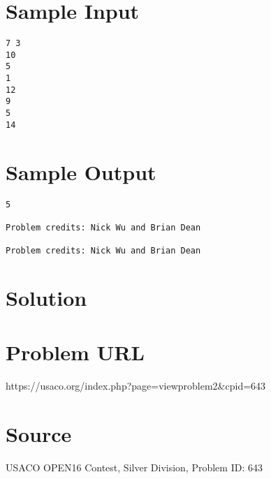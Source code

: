\documentclass[12pt]{article}
\begin{document}
\section*{Sample Input}
\begin{verbatim}
7 3
10
5
1
12
9
5
14
\end{verbatim}

\section*{Sample Output}
\begin{verbatim}
5

Problem credits: Nick Wu and Brian Dean

Problem credits: Nick Wu and Brian Dean
\end{verbatim}

\section*{Solution}


\section*{Problem URL}
https://usaco.org/index.php?page=viewproblem2&cpid=643

\section*{Source}
USACO OPEN16 Contest, Silver Division, Problem ID: 643
\end{document}
